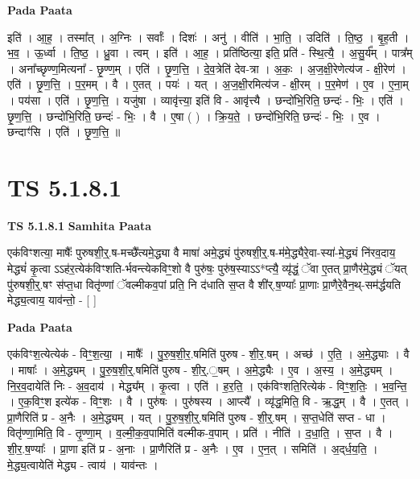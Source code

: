\documentclass[17pt]{extarticle}
\begin{document}
\textbf{Pada Paata} \newline

इति॑ । आ॒ह॒ । तस्मा᳚त् । अ॒ग्निः । सर्वाः᳚ । दिशः॑ । अनु॑ । वीति॑ । भा॒ति॒ । उदिति॑ । ति॒ष्ठ॒ । बृ॒ह॒ती । भ॒व॒ । ऊ॒र्ध्वा । ति॒ष्ठ॒ । ध्रु॒वा । त्वम् । इति॑ । आ॒ह॒ । प्रति॑ष्ठित्या॒ इति॒ प्रति॑ - स्थि॒त्यै॒ । अ॒सु॒र्य᳚म् । पात्र᳚म् । अना᳚च्छृण्ण॒मित्यना᳚ - छृ॒ण्ण॒म् । एति॑ । छृ॒ण॒त्ति॒ । दे॒व॒त्रेति॑ देव-त्रा । अ॒कः॒ । अ॒ज॒क्षी॒रेणेत्य॑ज - क्षी॒रेण॑ । एति॑ । छृ॒ण॒त्ति॒ । प॒र॒मम् । वै । ए॒तत् । पयः॑ । यत् । अ॒ज॒क्षी॒रमित्य॑ज - क्षी॒रम् । प॒र॒मेण॑ । ए॒व । ए॒ना॒म् । पय॑सा । एति॑ । छृ॒ण॒त्ति॒ । यजु॑षा । व्यावृ॑त्त्या॒ इति॑ वि - आवृ॑त्त्यै । छन्दो॑भि॒रिति॒ छन्दः॑ - भिः॒ । एति॑ । छृ॒ण॒त्ति॒ । छन्दो॑भि॒रिति॒ छन्दः॑ - भिः॒ । वै । ए॒षा ( ) । क्रि॒य॒ते॒ । छन्दो॑भि॒रिति॒ छन्दः॑ - भिः॒ । ए॒व । छन्दाꣳ॑सि । एति॑ । छृ॒ण॒त्ति॒ ॥  \newline





\section{ TS 5.1.8.1 }

\textbf{TS 5.1.8.1 } \newline
\textbf{Samhita Paata} \newline

एक॑विꣳशत्या॒ माषैः᳚ पुरुषशी॒र्॒.ष-मच्छै᳚त्यमे॒द्ध्या वै माषा॑ अमे॒द्ध्यं पु॑रुषशी॒र्॒.ष-म॑मे॒द्ध्यैरे॒वा-स्या॑-मे॒द्ध्यं नि॑रव॒दाय॒ मेद्ध्यं॑ कृ॒त्वा ऽऽह॑र॒त्येक॑विꣳशति-र्भवन्त्येकविꣳ॒॒शो वै पुरु॑षः॒ पुरु॑ष॒स्याऽऽ*प्त्यै॒ व्यृ॑द्धं॒ ॅवा ए॒तत् प्रा॒णैर॑मे॒द्ध्यं ॅयत् पु॑रुषशी॒र्॒.षꣳ स॑प्त॒धा वितृ॑ण्णां ॅवल्मीकव॒पां प्रति॒ नि द॑धाति स॒प्त वै शी॑र्.ष॒ण्याः᳚ प्रा॒णाः प्रा॒णैरे॒वैन॒थ्-सम॑र्द्धयति मेद्ध्य॒त्वाय॒ याव॑न्तो॒ - [  ] \newline

\textbf{Pada Paata} \newline

एक॑विꣳश॒त्येत्येक॑ - विꣳ॒॒श॒त्या॒ । माषैः᳚ । पु॒रु॒ष॒शी॒र॒.षमिति॑ पुरुष - शी॒र॒.षम् । अच्छ॑ । ए॒ति॒ । अ॒मे॒द्ध्याः । वै । माषाः᳚ । अ॒मे॒द्ध्यम् । पु॒रु॒ष॒शी॒र्॒.षमिति॑ पुरुष - शी॒र्॒.॒षम् । अ॒मे॒द्ध्यैः । ए॒व । अ॒स्य॒ । अ॒मे॒द्ध्यम् । नि॒र॒व॒दायेति॑ निः - अ॒व॒दाय॑ । मेद्ध्य᳚म् । कृ॒त्वा । एति॑ । ह॒र॒ति॒ । एक॑विꣳशति॒रित्येक॑ - विꣳ॒॒श॒तिः॒ । भ॒व॒न्ति॒ । ए॒क॒विꣳ॒॒श इत्ये॑क - विꣳ॒॒शः । वै । पुरु॑षः । पुरु॑षस्य । आप्त्यै᳚ । व्यृ॑द्ध॒मिति॒ वि - ऋ॒द्ध॒म् । वै । ए॒तत् । प्रा॒णैरिति॑ प्र - अ॒नैः । अ॒मे॒द्ध्यम् । यत् । पु॒रु॒ष॒शी॒र्॒.षमिति॑ पुरुष - शी॒र्॒.षम् । स॒प्त॒धेति॑ सप्त - धा । वितृ॑ण्णा॒मिति॒ वि - तृ॒ण्णा॒म् । व॒ल्मी॒क॒व॒पामिति॑ वल्मीक-व॒पाम् । प्रति॑ । नीति॑ । द॒धा॒ति॒ । स॒प्त । वै । शी॒र॒.ष॒ण्याः᳚ । प्रा॒णा इति॑ प्र - अ॒नाः । प्रा॒णैरिति॑ प्र - अ॒नैः । ए॒व । ए॒न॒त् । समिति॑ । अ॒द्‌र्ध॒य॒ति॒ । मे॒द्ध्य॒त्वायेति॑ मेद्ध्य - त्वाय॑ । याव॑न्तः ।  \newline
\end{document}
